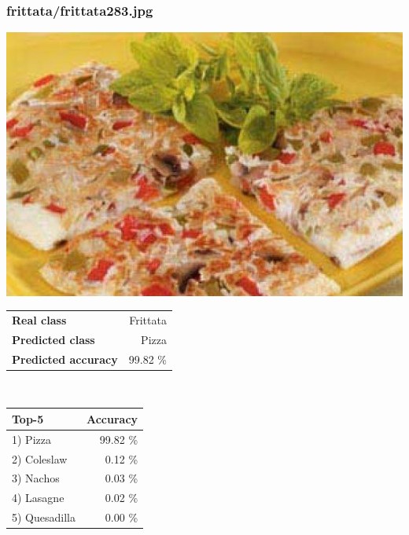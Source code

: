 \subsubsection{frittata/frittata283.jpg}

\begin{minipage}[t]{0.4\textwidth}
	\vspace{0pt}
	\includegraphics[width=\linewidth]{images/evaluation-images/frittata/frittata283.jpg}
\end{minipage}
\hfill
\begin{minipage}[t]{0.5\textwidth}
	\vspace{0pt}\raggedright
	\begin{tabularx}{\textwidth}{X r}
		\small \textbf{Real class} & \small Frittata\\
		\small \textbf{Predicted class} & \small Pizza\\
		\small \textbf{Predicted accuracy} & \small 99.82 \%
    \end{tabularx}\\
    
    \vspace{6pt}
	\begin{tabularx}{\textwidth}{X r}
        \small \textbf{Top-5} & \small \textbf{Accuracy} \\
        \hline
		\small 1) Pizza & \small 99.82 \%\\\small 2) Coleslaw & \small 0.12 \%\\\small 3) Nachos & \small 0.03 \%\\\small 4) Lasagne & \small 0.02 \%\\\small 5) Quesadilla & \small 0.00 \%
    \end{tabularx}
\end{minipage}
    

